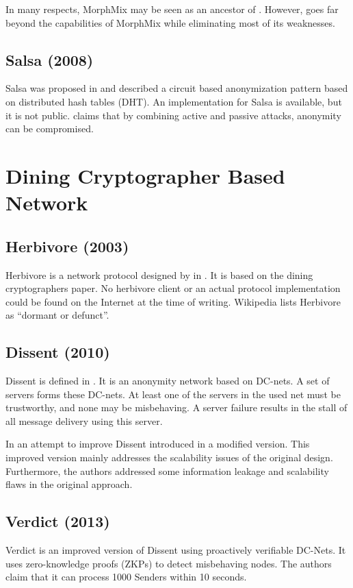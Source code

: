 In many respects, MorphMix may be seen as an ancestor of \MessageVortex. However, \MessageVortex goes far beyond the capabilities of MorphMix while eliminating most of its weaknesses.


\subsection{Salsa (2008)}
Salsa was proposed in \cite{Salsa} and described a circuit based anonymization pattern based on distributed hash tables (DHT). An implementation for Salsa is available, but it is not public. \cite{ccs2008:mittal} claims that by combining active and passive attacks, anonymity can be compromised.

\section{Dining Cryptographer Based Network}
\subsection{Herbivore (2003)}
Herbivore is a network protocol designed by \citeauthor{herbivore:tr} in \cite{herbivore:tr}. It is based on the dining cryptographers paper\cite{chaum-dc}. No herbivore client or an actual protocol implementation could be found on the Internet at the time of writing. Wikipedia lists Herbivore as ``dormant or defunct''.

\subsection{Dissent (2010)}
Dissent is defined in \cite{Corrigan-Gibbs:2010:DAA:1866307.1866346}. It is an anonymity network based on DC-nets. A set of servers forms these DC-nets. At least one of the servers in the used net must be trustworthy, and none may be misbehaving. A server failure results in the stall of all message delivery using this server.

In an attempt to improve Dissent \citeauthor{wolinsky2012dissent} introduced in \cite{wolinsky2012dissent} a modified version. This improved version mainly addresses the scalability issues of the original design. Furthermore, the authors addressed some information leakage and scalability flaws in the original approach.

\subsection{Verdict (2013)}
Verdict\cite{180367} is an improved version of Dissent using proactively verifiable DC-Nets. It uses zero-knowledge proofs (ZKPs) to detect misbehaving nodes. The authors claim that it can process 1000 Senders within 10 seconds.

